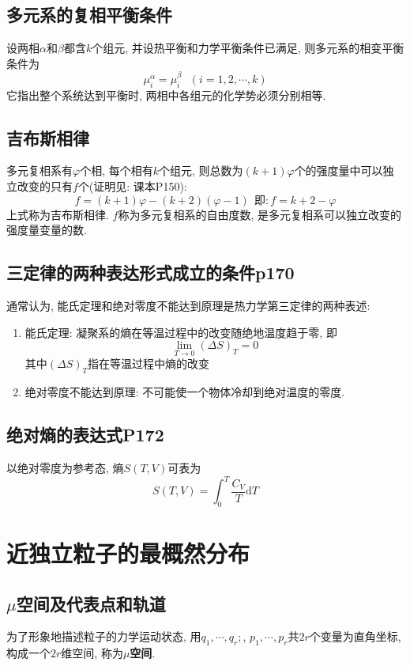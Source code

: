 \subsection{多元系的复相平衡条件}
设两相$\alpha$和$\beta$都含$k$个组元, 并设热平衡和力学平衡条件已满足, 则多元系的相变平衡条件为
$$
    \mu_i^\alpha=\mu_i^\beta \ \ \ (i=1,2,\cdots,k)
$$
它指出整个系统达到平衡时, 两相中各组元的化学势必须分别相等.

\subsection{吉布斯相律}
多元复相系有$\varphi$个相, 每个相有$k$个组元, 则总数为$(k+1)\varphi$个的强度量中可以独立改变的只有$f$个(证明见: 课本P150):
$$
    f=(k+1)\varphi-(k+2)(\varphi-1) \ \ \mathrm{即:} f=k+2-\varphi
$$
上式称为吉布斯相律. $f$称为多元复相系的自由度数, 是多元复相系可以独立改变的强度量变量的数.

\subsection{三定律的两种表达形式成立的条件p170}
通常认为, 能氏定理和绝对零度不能达到原理是热力学第三定律的两种表述:
\begin{enumerate}
    \item 能氏定理: 凝聚系的熵在等温过程中的改变随绝地温度趋于零, 即
          $$
              \lim_{T\rightarrow0}(\Delta S)_T=0
          $$
          其中$(\Delta S)_T$指在等温过程中熵的改变
    \item 绝对零度不能达到原理: 不可能使一个物体冷却到绝对温度的零度.
\end{enumerate}

\subsection{绝对熵的表达式P172}
以绝对零度为参考态, 熵$S(T,V)$可表为
$$
    S(T,V)=\int_0^T\frac{C_V}{T}\mathrm{d}T
$$


\section{近独立粒子的最概然分布}
\subsection{\texorpdfstring{$\mu$}{μ}空间及代表点和轨道}
为了形象地描述粒子的力学运动状态, 用$q_1,\cdots,q_r;$, $p_1,\cdots,p_r$共$2r$个变量为直角坐标, 构成一个$2r$维空间, 称为\textbf{$\mu$空间}.

